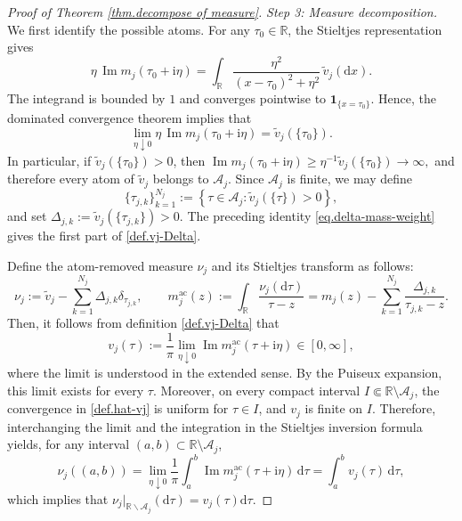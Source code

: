 \documentclass[11pt,twoside, a4paper]{article}
\numberwithin{equation}{section}
\numberwithin{figure}{section}
\theoremstyle{plain} %
\theoremstyle{definition}
\theoremstyle{remark}
\newcommand{\1} {\mspace{1 mu}}
\newcommand{\2} {\mspace{2 mu}}
\newcommand{\R} {\mathbb{R}}
\newcommand{\dd}{\mathrm{d}}
\DeclareMathOperator{\im}{Im}
\begin{document}
\begin{proof}[Proof of Theorem \ref{thm.decompose of measure}]
\medskip



\textit{Step 3: Measure decomposition.}
We first identify the possible atoms. For any \(\tau_0\in\mathbb R\), the Stieltjes representation gives
\[
  \eta\,\im m_j(\tau_0+\mathrm i\eta)
  =
  \int_{\mathbb R}
  \frac{\eta^2}{(x-\tau_0)^2+\eta^2}\,
  \widetilde v_j(\dd x).
\]
The integrand is bounded by \(1\) and converges pointwise to
\(\mathbf 1_{\{x=\tau_0\}}\). Hence, the dominated convergence theorem implies that
\begin{equation}\label{eq.delta-mass-weight}
  \lim_{\eta\downarrow0}
  \eta\,\im m_j(\tau_0+\mathrm i\eta)
  =
  \widetilde v_j(\{\tau_0\}).
\end{equation}
In particular, if \(\widetilde v_j(\{\tau_0\})>0\), then
$
  \im m_j(\tau_0+\mathrm i\eta)
  \ge \eta^{-1}\widetilde v_j(\{\tau_0\})
  \to \infty ,
$
and therefore every atom of \(\widetilde v_j\) belongs to \(\mathcal A_j\).
Since \(\mathcal A_j\) is finite, we may define
\[
  \{\tau_{j,k}\}_{k=1}^{N_j}
  :=
  \left\{
    \tau\in\mathcal{A}_j:
    \widetilde v_j(\{\tau\})>0
  \right\},
\]
and set
$
  \Delta_{j,k}:=\widetilde v_j(\{\tau_{j,k}\})>0 .
$
The preceding identity \eqref{eq.delta-mass-weight} gives the first part of \eqref{def.vj-Delta}.



Define the atom-removed measure $\nu_j$ and its Stieltjes transform as follows:
\begin{equation}\label{def.nuj}
  \nu_j  :=  \tilde{v}_j  -  \sum_{k=1}^{N_j}\Delta_{j,k}\delta_{\tau_{j,k}},\qquad m_j^{\mathrm{ac}}(z)  := \int_{\R} \frac{\nu_j(\dd \tau)}{\tau-z}= m_j(z)  -  \sum_{k=1}^{N_j}  \frac{\Delta_{j,k}}{\tau_{j,k}-z}.
\end{equation}
Then, it follows from definition \eqref{def.vj-Delta} that 
\begin{equation}\label{def.hat-vj}
  v_j(\tau):=\frac{1}{\pi}\lim_{\eta\downarrow 0}\im m^{\mathrm{ac}}_j(\tau+\mathrm i\eta)\in[0,\infty],
\end{equation}
where the limit is understood in the extended sense. By the Puiseux expansion, this limit exists for every \(\tau\). 
Moreover, on every compact interval \(I\Subset\mathbb R\setminus\mathcal A_j\), the convergence in \eqref{def.hat-vj} is uniform for \(\tau\in I\), and \( v_j\) is finite on \(I\).
Therefore, interchanging the limit and the integration in the Stieltjes inversion formula yields, for any interval
\((a,b)\subset\mathbb R\setminus\mathcal A_j\),
\[
  \nu_j((a,b))
  =
  \lim_{\eta\downarrow0}
  \frac1\pi\int_a^b
  \im m^{\mathrm{ac}}_j(\tau+\mathrm i\eta)\,\dd\tau
  =
  \int_a^b v_j(\tau)\,\dd\tau ,
\]
which implies that $\nu_j|_{\R\backslash\mathcal{A}_j}(\dd\tau)= v_j(\tau)\dd\tau$.


\end{proof}
\end{document}

